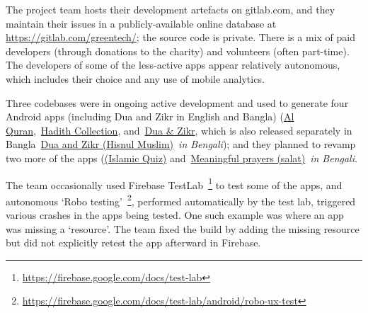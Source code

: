 
The project team hosts their development artefacts on gitlab.com, and they maintain their issues in a publicly-available online database at \url{https://gitlab.com/greentech/}; the source code is private. There is a mix of paid developers (through donations to the charity) and volunteers (often part-time). The developers of some of the less-active apps appear relatively autonomous, which includes their choice and any use of mobile analytics. 

Three codebases were in ongoing active development and used to generate four Android apps (including Dua and Zikr in English and Bangla) (\href{https://play.google.com/store/apps/details?id=com.greentech.quran}{Al Quran},~\href{https://play.google.com/store/apps/details?id=com.greentech.hadith}{Hadith Collection}, and~\href{https://play.google.com/store/apps/details?id=com.greentech.hisnulmuslim}{Dua \& Zikr}, which is also released separately in Bangla~\href{https://play.google.com/store/apps/details?id=com.greentech.hisnulmuslimbn}{{Dua and Zikr (Hisnul Muslim)}}~\emph{in Bengali}); and they planned to revamp two more of the apps (\href{https://play.google.com/store/apps/details?id=com.greentech.islamicquiz}{(Islamic Quiz)} and~\href{https://play.google.com/store/apps/details?id=com.greentech.salatbn}{Meaningful prayers (salat)}~\textit{in Bengali}. %

The team occasionally used Firebase TestLab~\footnote{\url{https://firebase.google.com/docs/test-lab}} to test some of the apps, and autonomous `Robo testing'~\footnote{\url{https://firebase.google.com/docs/test-lab/android/robo-ux-test}}, performed automatically by the test lab, triggered various crashes in the apps being tested. One such example was where an app was missing a `resource'. The team fixed the build by adding the missing resource but did not explicitly retest the app afterward in Firebase.  


